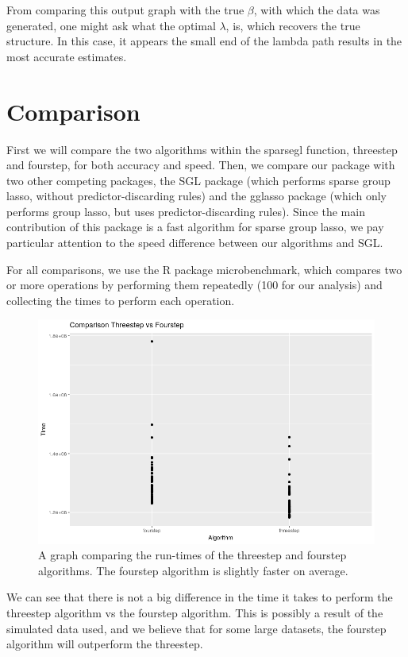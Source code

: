 \documentclass[titlepage]{article}
\begin{document}
From comparing this output graph with the true $\beta$, with which the data was generated, one might ask what the optimal $\lambda$, is, which recovers the true structure. In this case, it appears the small end of the lambda path results in the most accurate estimates.


\section{Comparison}

First we will compare the two algorithms within the sparsegl function, threestep and fourstep, for both accuracy and speed. Then, we compare our package with two other competing packages, the SGL package (which performs sparse group lasso, without predictor-discarding rules) and the gglasso package (which only performs group lasso, but uses predictor-discarding rules). Since the main contribution of this package is a fast algorithm for sparse group lasso, we pay particular attention to the speed difference between our algorithms and SGL.

For all comparisons, we use the R package microbenchmark, which compares two or more operations by performing them repeatedly (100 for our analysis) and collecting the times to perform each operation.

\begin{figure}[tb!]
\centering
\includegraphics[scale=0.5]{threevsfour.png}
\caption{A graph comparing the run-times of the threestep and fourstep algorithms. The fourstep algorithm is slightly faster on average.}
\label{fig:threevsfour}
\end{figure}


We can see that there is not a big difference in the time it takes to perform the threestep algorithm vs the fourstep algorithm. This is possibly a result of the simulated data used, and we believe that for some large datasets, the fourstep algorithm will outperform the threestep.
\end{document}
